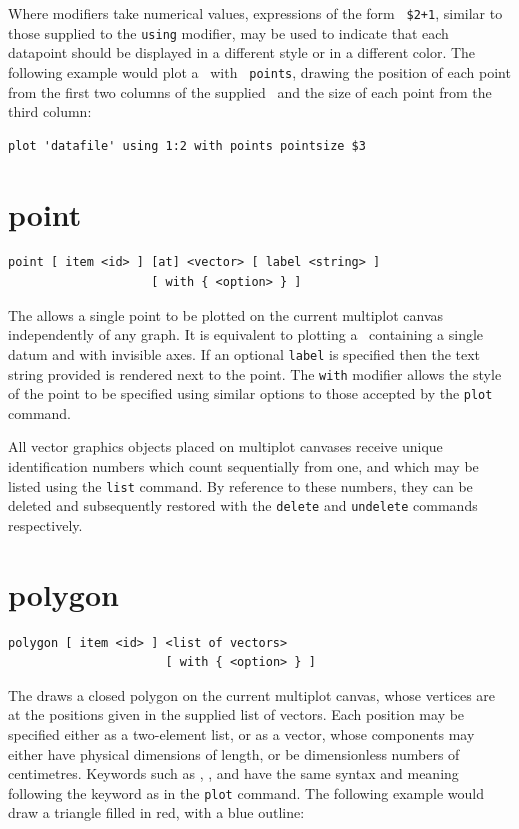 \noindent Where modifiers take numerical values, expressions of the form {\tt
\$2+1}, similar to those supplied to the {\tt using} modifier, may be used to
indicate that each datapoint should be displayed in a different style or in a
different color. The following example would plot a \datafile\ with {\tt
points}, drawing the position of each point from the first two columns of the
supplied \datafile\ and the size of each point from the third column:
\begin{verbatim}
plot 'datafile' using 1:2 with points pointsize $3
\end{verbatim}


\section{point}

\begin{verbatim}
point [ item <id> ] [at] <vector> [ label <string> ]
                    [ with { <option> } ]
\end{verbatim}

The  allows a single point to be plotted on the current
multiplot canvas independently of any graph.  It is equivalent to plotting a
\datafile\ containing a single datum and with invisible axes.  If an optional
{\tt label} is specified then the text string provided is rendered next to the
point.  The {\tt with} modifier allows the style of the point to be specified
using similar options to those accepted by the {\tt plot} command.

All vector graphics objects placed on multiplot canvases receive unique
identification numbers which count sequentially from one, and which may be
listed using the {\tt list} command.  By reference to these numbers, they can
be deleted and subsequently restored with the {\tt delete} and {\tt undelete}
commands respectively.


\section{polygon}

\begin{verbatim}
polygon [ item <id> ] <list of vectors>
                      [ with { <option> } ]
\end{verbatim}

The  draws a closed polygon on the current multiplot canvas,
whose vertices are at the positions given in the supplied list of vectors. Each
position may be specified either as a two-element list, or as a vector, whose
components may either have physical dimensions of length, or be dimensionless
numbers of centimetres. Keywords such as , ,
 and  have the same syntax and meaning
following the keyword  as in the {\tt plot} command. The
following example would draw a triangle filled in red, with a blue outline:


